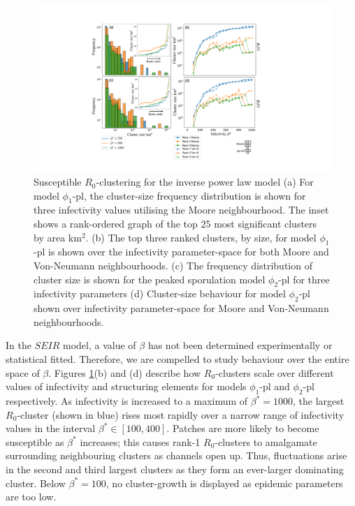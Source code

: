 \begin{figure}
    \centering
    \includegraphics[scale=0.45]{chapter6/figures/fig6-pl-cluster-distribution.pdf}
    \caption{Susceptible $R_0$-clustering for the inverse power law model (a) For model $\phi_1$-pl, the cluster-size frequency distribution is shown for three infectivity values utilising the Moore neighbourhood. The inset shows a rank-ordered graph of the top $25$ most significant clusters by area $\mathrm{km^2}$. (b) The top three ranked clusters, by size, for model $\phi_1$-pl is shown over the infectivity parameter-space for both Moore and Von-Neumann neighbourhoods. (c) The frequency distribution of cluster size is shown for the peaked sporulation model $\phi_2$-pl for three infectivity parameters (d) Cluster-size behaviour for model $\phi_2$-pl shown over infectivity parameter-space for Moore and Von-Neumann neighbourhoods.}
    \label{fig:inverse-power-law-clustering}
\end{figure}

In the $SEIR$ model, a value of $\beta$ has not been determined experimentally or statistical fitted.
Therefore, we are compelled to study behaviour over the entire space of $\beta$.
Figures \ref{fig:inverse-power-law-clustering}(b) and (d) describe how $R_0$-clusters scale over different values of infectivity and structuring elements for models $\phi_1$-pl and $\phi_2$-pl respectively.
As infectivity is increased to a maximum of $\beta^*=1000$, the largest $R_0$-cluster (shown in blue) rises most rapidly over a narrow range of infectivity values in the interval $\beta^*\in [100, 400]$.
Patches are more likely to become susceptible as $\beta^*$ increases; this causes rank-1 $R_0$-clusters to amalgamate surrounding neighbouring clusters as channels open up.
Thus, fluctuations arise in the second and third largest clusters as they form an ever-larger dominating cluster.
Below $\beta^*=100$, no cluster-growth is displayed as epidemic parameters are too low. 
 
